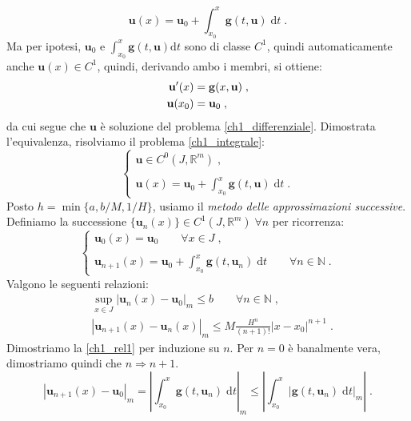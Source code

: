 \documentclass[a4paper,12pt]{report}
\theoremstyle{plain}
\theoremstyle{definition}
\theoremstyle{remark}
\newcommand{\diff}[1]{\mathrm{d}#1}
\numberwithin{equation}{section}
\begin{document}
\begin{equation}
\mathbf{u}(x)=\mathbf{u}_0+\int_{x_0}^x \mathbf{g}(t,\mathbf{u})\;\diff{t}\;.
\end{equation}
Ma per ipotesi, $\mathbf{u}_0$ e $\int_{x_0}^x \mathbf{g}(t,\mathbf{u})\diff{t}$ sono di classe $C^1$, quindi automaticamente anche $\mathbf{u}(x) \in C^1$, quindi, derivando ambo i membri, si ottiene:
\begin{align}
\mathbf{u}'(x) &= \mathbf{g}(x,\mathbf{u})\;, \notag \\
\mathbf{u}(x_0)&=\mathbf{u}_0\;,
\end{align}
da cui segue che $\mathbf{u}$ è soluzione del problema \eqref{ch1_differenziale}. Dimostrata l'equivalenza, risolviamo il problema \eqref{ch1_integrale}:
\begin{equation}
\begin{cases}
 \mathbf{u} \in C^0(J,\mathbb{R}^m)\;, \\
 \\
 \mathbf{u}(x)=\mathbf{u}_0+\displaystyle{\int_{x_0}^x \mathbf{g}(t,\mathbf{u})\;\diff{t}}\;.
\end{cases}
\end{equation}
Posto $h=\min\{a,b/M,1/H\}$, usiamo il \textit{metodo delle approssimazioni successive}. Definiamo la successione
$\{ \mathbf{u}_n(x)\} \in C^1(J,\mathbb{R}^m)\; \forall n$ per ricorrenza:
\begin{equation}
\begin{cases}
 \mathbf{u}_0(x)=\mathbf{u}_0 \qquad \forall x \in J\;, \\
 \\
 \mathbf{u}_{n+1}(x)=\mathbf{u}_0+\displaystyle{\int_{x_0}^x \mathbf{g}(t,\mathbf{u}_n)\;\diff{t}} \qquad \forall n \in \mathbb{N}\;.
\end{cases}
\end{equation}
Valgono le seguenti relazioni:
\begin{align}
&\sup_{x\in J}|\mathbf{u}_n(x)-\mathbf{u}_0|_m\le b\qquad \forall n\in\mathbb{N}\;, \label{ch1_rel1} \\
&|\mathbf{u}_{n+1}(x)-\mathbf{u}_n(x)|_m\le M\frac{H^n}{(n+1)!}|x-x_0|^{n+1}\;. \label{ch2_rel2}
\end{align}
Dimostriamo la \eqref{ch1_rel1} per induzione su $n$. Per $n=0$ è banalmente vera, dimostriamo quindi che $n \Longrightarrow n+1$.
\begin{equation}
|\mathbf{u}_{n+1}(x)-\mathbf{u}_0|_m = \left|\int_{x_0}^x \mathbf{g}(t,\mathbf{u}_n)\;\diff{t}\right|_m \le \left|\int_{x_0}^x |\mathbf{g}
(t,\mathbf{u}_n)\;\diff{t}|_m \right|\;.
\end{equation}
\end{document}
